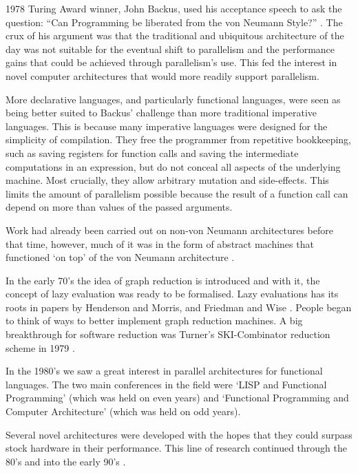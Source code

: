     1978 Turing Award winner, John Backus, used his acceptance speech to ask the
question: ``Can Programming be liberated from the von Neumann Style?''
\citep{HistoryOfHaskell}. The crux of his argument was that the traditional
and ubiquitous architecture of the day was not suitable for the eventual shift
to parallelism and the performance gains that could be achieved through
parallelism's use. This fed the
interest in novel computer architectures that would more readily support
parallelism.

More declarative languages, and particularly functional languages, were seen as
being better suited to Backus' challenge than more traditional imperative
languages. This is because many imperative languages were designed for the
simplicity of compilation. They free the programmer from repetitive
bookkeeping, such as saving registers for function calls and saving the
intermediate computations in an expression, but do not conceal all aspects of
the underlying machine. Most crucially, they allow arbitrary mutation and
side-effects. This limits the amount of parallelism possible because the result
of a function call can depend on more than values of the passed arguments.

    Work had already been carried out on non-von Neumann architectures
before that time, however, much of it was in the form of abstract machines
that functioned `on top' of the von Neumann architecture \citep{turnerHistory}.

In the early 70's the idea of graph reduction is introduced \citep{wadsworth}
and with it, the concept of lazy evaluation was ready to be formalised.
Lazy evaluations has its roots in papers by Henderson and Morris, and Friedman
and Wise \citep{turnerHistory}.  People began to think of ways to better
implement graph reduction machines.  A big breakthrough for software reduction
was Turner's SKI-Combinator reduction scheme in 1979 \citep{turnerHistory,
clackbook}.

    In the 1980's we saw a great interest in parallel architectures for
functional languages. The two main conferences in the field were `LISP and
Functional Programming' (which was held on even years) and `Functional
Programming and Computer Architecture' (which was held on odd years).

    Several novel architectures were developed with the hopes that they could
surpass stock hardware in their performance. This line of research continued
through the 80's and into the early 90's \citep{Alice, GRIP, clackbook,
PFPAnIntro}.

